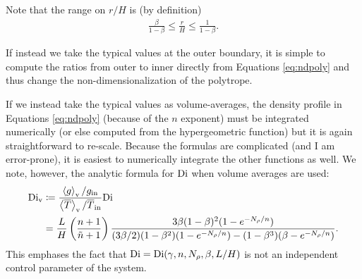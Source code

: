 \documentclass[12pt]{article}
\numberwithin{equation}{section}
\begin{document}
Note that the range on $r/H$ is (by definition)
\begin{align}
	\frac{\beta}{1-\beta}\leq \frac{r}{H} \leq \frac{1}{1-\beta}. 
\end{align}

If instead we take the typical values at the outer boundary, it is simple to compute the ratios from outer to inner directly from Equations \eqref{eq:ndpoly} and thus change the non-dimensionalization of the polytrope. 

If we instead take the typical values as volume-averages, the density profile in Equations \eqref{eq:ndpoly} (because of the $n$ exponent) must be integrated numerically (or else computed from the hypergeometric function) but it is again straightforward to re-scale. Because the formulas are complicated (and I am error-prone), it is easiest to numerically integrate the other functions as well. We note, however, the analytic formula for ${\rm{Di}}$ when volume averages are used: 
\begin{align}\label{eq:digory}
	{\rm{Di}}_{\rm{v}} &\coloneqq \frac{\left\langle g\right\rangle_{\rm{v}}/g_{\rm{in}}}{\left\langle\overline{T}\right\rangle_{\rm{v}}/\overline{T}_{\rm{in}}}{\rm{Di}} \nonumber\\
	&= \frac{L}{H}\left(\frac{n+1}{\tilde{n}+1}\right)   \frac{3 \beta (1 - \beta)^2 (1 - e^{-N_\rho/n})} 
	{ (3\beta/2) (1 - \beta^2) (1 - e^{-N_\rho/n}) - (1-\beta^3)(\beta-e^{-N_\rho/n})}. 
\end{align}
This emphases the fact that ${\rm{Di}}={\rm{Di}}(\gamma,n,N_\rho,\beta,L/H)$ is not an independent control parameter of the system. 
\end{document}
